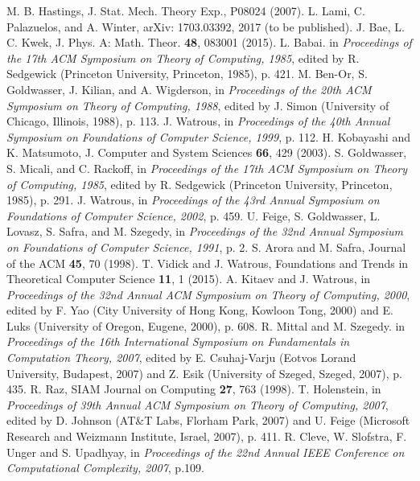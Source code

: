 \documentclass[aps,prx,twocolumn,showpacs,amsmath,notitlepage,amssymb,superscriptaddress]{revtex4-1}
\begin{document}
\begin{thebibliography}{99}
 M. B. Hastings, J. Stat. Mech. Theory Exp., P08024 (2007).
 L. Lami, C. Palazuelos, and A. Winter, arXiv: 1703.03392, 2017 (to be published).
 J. Bae, L. C. Kwek, J. Phys. A: Math. Theor. {\bf 48}, 083001 (2015).
 L. Babai. in {\it Proceedings of the 17th ACM Symposium on Theory of Computing, 1985}, edited by R. Sedgewick (Princeton University, Princeton, 1985), p. 421.
 M. Ben-Or, S. Goldwasser, J. Kilian, and A. Wigderson, in {\it Proceedings of the 20th ACM Symposium on Theory of Computing, 1988}, edited by J. Simon (University of Chicago, Illinois, 1988), p. 113.
 J. Watrous, in {\it Proceedings of the 40th Annual Symposium on Foundations of Computer Science, 1999}, p. 112.
 H. Kobayashi and K. Matsumoto, J. Computer and System Sciences {\bf 66}, 429 (2003).
 S. Goldwasser, S. Micali, and C. Rackoff, in {\it Proceedings of the 17th ACM Symposium on Theory of Computing, 1985}, edited by R. Sedgewick (Princeton University, Princeton, 1985), p. 291.
 J. Watrous, in {\it Proceedings of the 43rd Annual Symposium on Foundations of Computer Science, 2002}, p. 459.
 U. Feige, S. Goldwasser, L. Lovasz, S. Safra, and M. Szegedy, in {\it Proceedings of the 32nd Annual Symposium on Foundations of Computer Science, 1991}, p. 2.
 S. Arora and M. Safra, Journal of the ACM {\bf 45}, 70 (1998).
 T. Vidick and J. Watrous, Foundations and Trends in Theoretical Computer Science {\bf 11}, 1 (2015).
 A. Kitaev and J. Watrous, in {\it Proceedings of the 32nd Annual ACM Symposium on Theory of Computing, 2000}, edited by F. Yao (City University of Hong Kong, Kowloon Tong, 2000) and E. Luks (University of Oregon, Eugene, 2000), p. 608.
 R. Mittal and M. Szegedy. in {\it Proceedings of the 16th International Symposium on Fundamentals in Computation Theory, 2007}, edited by E. Csuhaj-Varju (Eotvos Lorand University, Budapest, 2007) and Z. Esik (University of Szeged, Szeged, 2007), p. 435.
 R. Raz, SIAM Journal on Computing {\bf 27}, 763 (1998).
 T. Holenstein, in {\it Proceedings of 39th Annual ACM Symposium on Theory of Computing, 2007}, edited by D. Johnson (AT\&T Labs, Florham Park, 2007) and U. Feige (Microsoft Research and Weizmann Institute, Israel, 2007), p. 411.
 R. Cleve, W. Slofstra, F. Unger and S. Upadhyay, in {\it Proceedings of the 22nd Annual IEEE Conference on Computational Complexity, 2007}, p.109.

\end{thebibliography}
\end{document}
